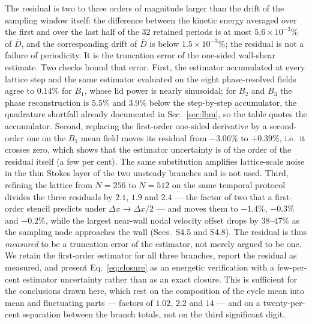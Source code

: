 \documentclass[11pt,a4paper]{article}
\newcommand{\Dbar}{\overline{D}}
\begin{document}
The residual is two to three orders of magnitude larger than the drift of the
sampling window itself: the difference between the kinetic energy averaged over the
first and over the last half of the $32$ retained periods is at most
$5.6\times10^{-3}\%$ of $\Dbar$, and the corresponding drift of $\Dbar$ is below
$1.5\times10^{-3}\%$; the residual is not a failure of periodicity. It is
the truncation error of the one-sided wall-shear estimate. Two checks bound that
error. First, the estimator accumulated at every lattice step and the same
estimator evaluated on the eight phase-resolved fields agree to $0.14\%$ for $B_1$,
whose lid power is nearly sinusoidal; for $B_2$ and $B_3$ the phase reconstruction
is $5.5\%$ and $3.9\%$ below the step-by-step accumulator, the quadrature shortfall
already documented in Sec.~\ref{sec:lbm}, so the table quotes the accumulator.
Second, replacing the first-order one-sided derivative by a second-order one on the
$B_1$ mean field moves its residual from $-3.06\%$ to $+0.39\%$, i.e.\ it crosses
zero, which shows that the estimator uncertainty is of the order of the residual
itself (a few per cent). The same substitution amplifies lattice-scale noise in the
thin Stokes layer of the two unsteady branches and is not used.
Third, refining the lattice from $N=256$ to $N=512$ on the same temporal protocol
divides the three residuals by $2.1$, $1.9$ and $2.4$ --- the factor of two that a
first-order stencil predicts under $\Delta x\to\Delta x/2$ --- and moves them to
$-1.4\%$, $-0.3\%$ and $-0.2\%$, while the largest near-wall nodal velocity
offset drops by $38$--$47\%$ as the sampling node approaches the wall (Secs.~S4.5 and S4.8). The residual is thus
\emph{measured} to be a truncation error of the estimator, not merely argued to be
one.
We retain the first-order
estimator for all three branches, report the residual as measured, and present
Eq.~\eqref{eq:closure} as an energetic verification with a few-per-cent estimator
uncertainty rather than as an exact closure. This is sufficient for the
conclusions drawn here, which rest on the composition of the cycle mean into mean
and fluctuating parts --- factors of $1.02$, $2.2$ and $14$ --- and on a
twenty-per-cent separation between the branch totals, not on the third significant
digit.
\end{document}
